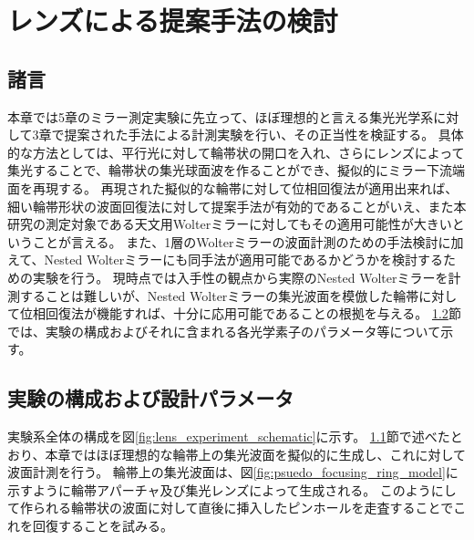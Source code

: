 \chapter{レンズによる提案手法の検討}
\thispagestyle{empty}
\label{chap4}
\graphicspath{{chap4/figure/}}
\minitoc

\newpage


\section{諸言}
\label{chap4_introduction}

本章では5章のミラー測定実験に先立って、ほぼ理想的と言える集光光学系に対して3章で提案された手法による計測実験を行い、その正当性を検証する。
具体的な方法としては、平行光に対して輪帯状の開口を入れ、さらにレンズによって集光することで、輪帯状の集光球面波を作ることができ、擬似的にミラー下流端面を再現する。
再現された擬似的な輪帯に対して位相回復法が適用出来れば、細い輪帯形状の波面回復法に対して提案手法が有効的であることがいえ、また本研究の測定対象である天文用Wolterミラーに対してもその適用可能性が大きいということが言える。
また、1層のWolterミラーの波面計測のための手法検討に加えて、Nested Wolterミラーにも同手法が適用可能であるかどうかを検討するための実験を行う。
現時点では入手性の観点から実際のNested Wolterミラーを計測することは難しいが、Nested Wolterミラーの集光波面を模倣した輪帯に対して位相回復法が機能すれば、十分に応用可能であることの根拠を与える。
\ref{chap4_experiment_setup}節では、実験の構成およびそれに含まれる各光学素子のパラメータ等について示す。


\clearpage
\newpage

\section{実験の構成および設計パラメータ}
\label{chap4_experiment_setup}

実験系全体の構成を図\ref{fig:lens_experiment_schematic}に示す。
\ref{chap4_introduction}節で述べたとおり、本章ではほぼ理想的な輪帯上の集光波面を擬似的に生成し、これに対して波面計測を行う。
輪帯上の集光波面は、図\ref{fig:psuedo_focusing_ring_model}に示すように輪帯アパーチャ及び集光レンズによって生成される。
このようにして作られる輪帯状の波面に対して直後に挿入したピンホールを走査することでこれを回復することを試みる。

